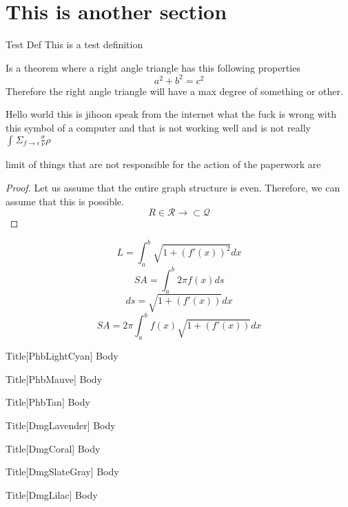 \documentclass[letterpaper,10pt,twoside,onecolumn,openany]{book}
\begin{document}
\section{This is another section}
\begin{Definition}{Test Def}
    This is a test definition
\end{Definition}
\begin{paperbox}{}
    \begin{theorem}
        Is a theorem where a right angle triangle has this following properties
        \[a^2 + b^2 = c^2\]
        Therefore the right angle triangle will have a max degree of something or other.
    \end{theorem}
\end{paperbox}
Hello world this is jihoon speak from the internet
what the fuck is wrong with this symbol of a computer and that is not working well and is not really
\(\int_{}^{}\Sigma_{f \to \epsilon   }   \frac{\sigma}{\nu}\rho\)
\lipsum[2]
\underline{}
\lipsum[3]
\begin{quotebox}
    \lipsum[1]
\end{quotebox}
\lipsum[4]
\lipsum[5]
\lipsum[6]
\lipsum[7]
\newpage
limit of things that are not responsible for the action of the paperwork are
\begin{proof}
    Let us assume that the entire graph structure is even. Therefore, we can assume that this is possible.
    \[R \in \mathcal{R} \rightarrow \subset \mathcal{Q}\]
\end{proof}
\begin{equation}
    L = \int_{a}^{b}\sqrt{1 + (f'(x))^2}dx
\end{equation}
\begin{equation}
    SA  =\int_{a}^{b}2\pi f(x) ds
\end{equation}
\begin{equation}
    ds = \sqrt{1 + (f'(x))}dx   
\end{equation}
\begin{equation}
    SA = 2\pi \int_{a}^{b} f(x) \sqrt{1 + (f'(x))}dx
\end{equation}
\begin{paperbox}{Title}[PhbLightCyan]
    Body
\end{paperbox}
\begin{paperbox}{Title}[PhbMauve]
    Body
\end{paperbox}
\begin{paperbox}{Title}[PhbTan]
    Body
\end{paperbox}
\begin{paperbox}{Title}[DmgLavender]
    Body
\end{paperbox}
\begin{paperbox}{Title}[DmgCoral]
    Body
\end{paperbox}
\begin{paperbox}{Title}[DmgSlateGray]
    Body
\end{paperbox}
\begin{paperbox}{Title}[DmgLilac]
    Body
\end{paperbox}
\end{document}
